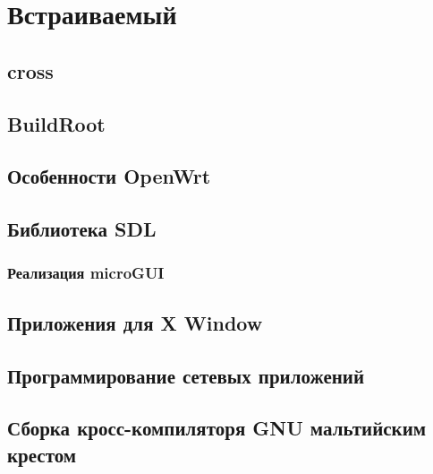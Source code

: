 \part{Встраиваемый \emlinux}







\chapter{cross}

\chapter{BuildRoot}

\chapter{Особенности OpenWrt}

\chapter{Библиотека SDL}

\section{Реализация microGUI}

\chapter{Приложения для X Window}

\chapter{Программирование сетевых приложений}

\chapter{Сборка кросс-компиляторя GNU мальтийским крестом}
